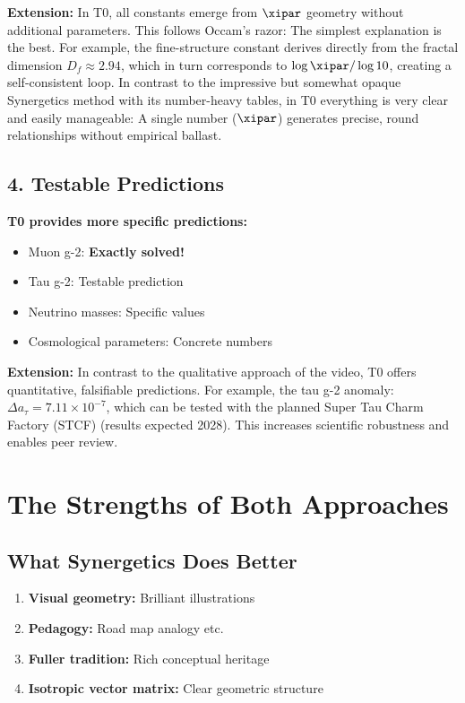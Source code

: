 	\textbf{Extension:} In T0, all constants emerge from $\xipar$ geometry without additional parameters. This follows Occam's razor: The simplest explanation is the best. For example, the fine-structure constant derives directly from the fractal dimension $D_f \approx 2.94$, which in turn corresponds to $\log \xipar / \log 10$, creating a self-consistent loop. In contrast to the impressive but somewhat opaque Synergetics method with its number-heavy tables, in T0 everything is very clear and easily manageable: A single number ($\xipar$) generates precise, round relationships without empirical ballast.
	
	\subsection{4. Testable Predictions}
	
	\begin{vorteil}
		\textbf{T0 provides more specific predictions:}
		\begin{itemize}
			\item Muon g-2: \textbf{Exactly solved!}
			\item Tau g-2: Testable prediction
			\item Neutrino masses: Specific values
			\item Cosmological parameters: Concrete numbers
		\end{itemize}
		
		\textbf{Extension:} In contrast to the qualitative approach of the video, T0 offers quantitative, falsifiable predictions. For example, the tau g-2 anomaly: $\Delta a_\tau = 7.11 \times 10^{-7}$, which can be tested with the planned Super Tau Charm Factory (STCF) (results expected 2028). This increases scientific robustness and enables peer review.
	\end{vorteil}
	\section{The Strengths of Both Approaches}
	
	\subsection{What Synergetics Does Better}
	
	\begin{enumerate}
		\item \textbf{Visual geometry:} Brilliant illustrations
		\item \textbf{Pedagogy:} Road map analogy etc.
		\item \textbf{Fuller tradition:} Rich conceptual heritage
		\item \textbf{Isotropic vector matrix:} Clear geometric structure
	\end{enumerate}
	
